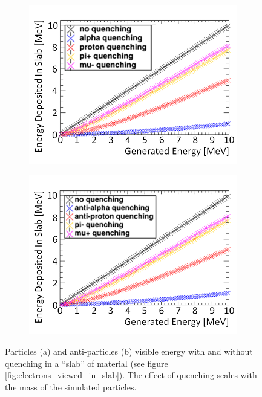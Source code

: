 \begin{figure}[!h]
\centering
\begin{subfigure}{.45\textwidth}
  \centering
  \includegraphics[width=\linewidth]{Chapter4/Figs/Raster/quenchingNormalComparison.png}
  \captionsetup{width=.9\linewidth}
  \caption{}
  \label{subFig:proton_quenched_and_not}
\end{subfigure}%
\begin{subfigure}{.45\textwidth}
  \centering
  \includegraphics[width=\linewidth]{Chapter4/Figs/Raster/quenchingAntiComparison.png}
  \captionsetup{width=.9\linewidth}
  \caption{}
  \label{subFig:Aproton_quenched_and_not}
\end{subfigure}
\caption{Particles (a) and anti-particles (b) visible energy with and without quenching in a ``slab'' of material (see figure \ref{fig:electrons_viewed_in_slab}). The effect of quenching scales with the mass of the simulated particles.}
\label{fig:proton_Apronton_quenched_and_not}
\end{figure}

